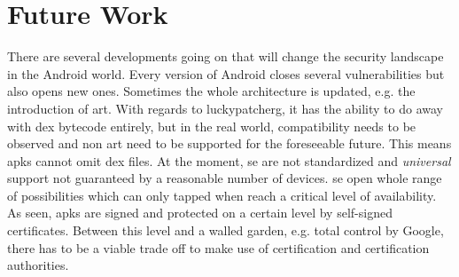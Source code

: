 \section{Future Work}\label{section:conclusion-future}
There are several developments going on that will change the security landscape in the Android world.
\newline
\newline
Every version of Android closes several vulnerabilities but also opens new ones.
Sometimes the whole architecture is updated, e.g. the introduction of \gls{art}.
With regards to \gls{luckypatcherg}, it has the ability to do away with dex bytecode entirely, but in the real world, compatibility needs to be observed and non \gls{art} need to be supported for the foreseeable future.
This means \gls{apk}s cannot omit \gls{dex} files.
\newline
\newline
At the moment, \gls{se} are not standardized and \textit{universal} support not guaranteed by a reasonable number of devices.
\gls{se} open whole range of possibilities which can only tapped when reach a critical level of availability.
\newline
\newline
As seen, \gls{apk}s are signed and protected on a certain level by self-signed certificates.
Between this level and a walled garden, e.g. total control by Google, there has to be a viable trade off to make use of certification and certification authorities.
